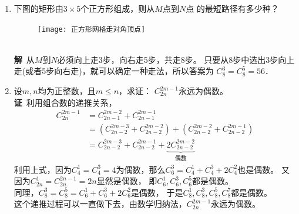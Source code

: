 \begin{enumerate}[label={【\textbf{例\thechapter.\arabic*}】},
 leftmargin=\inteval{\myenumleftmargin}pt,
 itemsep=\inteval{\myenumitempsep}pt,
 itemindent=\inteval{\myenumitemindent}pt]
\item 下图的矩形由$ 3\times 5 $个正方形组成，则从$ M $点到$ N $点
的最短路径有多少种？
\begin{figure}[h]
    \centering
    \texttt{[image: 正方形网格走对角顶点]}
\end{figure} \\
\textbf{解}\ 从$ M $到$ N $必须向上走3步，向右走5步，共走8步。
只要从8步中选出3步向上走(或者5步向右走)，就可以确定一种走法，所以答案为
$ C_8^3=C_8^5=56 $．

\item \label{C_2n^1357都是偶数} 
设$m,n$均为正整数，且$m\leq n$，求证：
$ C_{2n}^{2m-1} $永远为偶数。\\
\textbf{证}\ 利用组合数的递推关系，
\begin{align*}
    C_{2n}^{2m-1} &=C_{2n-1}^{2m-2}+C_{2n-1}^{2m-1}  \\
    &=(C_{2n-2}^{2m-3}+C_{2n-2}^{2m-2})+(C_{2n-2}^{2m-2}+C_{2n-2}^{2m-1}) \\
    &=C_{2n-2}^{2m-3}+C_{2n-2}^{2m-1}+
    \underbrace{2C_{2n-2}^{2m-2}}_{\text{偶数}} 
\end{align*}
利用上式，因为$C_4^1=C_4^3=4$为偶数，那么$C_6^3=C_4^1+C_4^3+2C_4^2$也是偶数。
又因为$ C_{2n}^1=C_{2n}^{2n-1}=2n $显然是偶数，
即$C_6^1,C_6^3,C_6^5$都是偶数。\\
同理，$ C_8^3=C_8^5=C_6^1+C_6^3+2C_6^2 $是偶数，
于是$C_8^1,C_8^3,C_8^5,C_8^7$都是偶数。\\
这个递推过程可以一直做下去，由数学归纳法，$ C_{2n}^{2m-1} $永远为偶数。


\end{enumerate}
